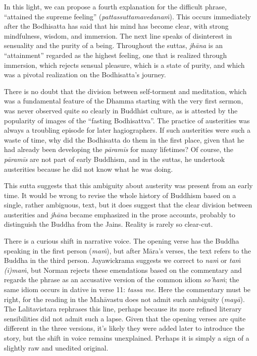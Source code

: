 \documentclass[12pt,openany]{book}%
\begin{document}
In this light, we can propose a fourth explanation for the difficult phrase, “attained the supreme feeling” (\textit{\textsanskrit{pattassuttamavedanaṁ}}). This occurs immediately after the Bodhisatta has said that his mind has become clear, with strong mindfulness, wisdom, and immersion. The next line speaks of disinterest in sensuality and the purity of a being. Throughout the suttas, \textit{\textsanskrit{jhāna}} is an “attainment” regarded as the highest feeling, one that is realized through immersion, which rejects sensual pleasure, which is a state of purity, and which was a pivotal realization on the Bodhisatta’s journey.

There is no doubt that the division between self-torment and meditation, which was a fundamental feature of the Dhamma starting with the very first sermon, was never observed quite so clearly in Buddhist culture, as is attested by the popularity of images of the “fasting Bodhisattva”. The practice of austerities was always a troubling episode for later hagiographers. If such austerities were such a waste of time, why did the Bodhisatta do them in the first place, given that he had already been developing the \textit{\textsanskrit{pāramīs}} for many lifetimes? Of course, the \textit{\textsanskrit{pāramīs}} are not part of early Buddhism, and in the suttas, he undertook austerities because he did not know what he was doing.

This sutta suggests that this ambiguity about austerity was present from an early time. It would be wrong to revise the whole history of Buddhism based on a single, rather ambiguous, text, but it does suggest that the clear division between austerities and \textit{\textsanskrit{jhāna}} became emphasized in the prose accounts, probably to distinguish the Buddha from the Jains. Reality is rarely so clear-cut.

There is a curious shift in narrative voice. The opening verse has the Buddha speaking in the first person (\textit{\textsanskrit{maṁ}}), but after \textsanskrit{Māra}’s verses, the text refers to the Buddha in the third person. Jayawickrama suggests we correct to \textit{\textsanskrit{naṁ}} or \textit{\textsanskrit{taṁ} (i)\textsanskrit{maṁ}}, but Norman rejects these emendations based on the commentary and regards the phrase as an accusative version of the common idiom \textit{so’\textsanskrit{haṁ}}; the same idiom occurs in dative in verse 11: \textit{tassa me}. Here the commentary must be right, for the reading in the \textsanskrit{Mahāvastu} does not admit such ambiguity (\textit{\textsanskrit{mayā}}). The Lalitavistara rephrases this line, perhaps because its more refined literary sensibilities did not admit such a lapse. Given that the opening verses are quite different in the three versions, it’s likely they were added later to introduce the story, but the shift in voice remains unexplained. Perhaps it is simply a sign of a slightly raw and unedited original.
\end{document}
